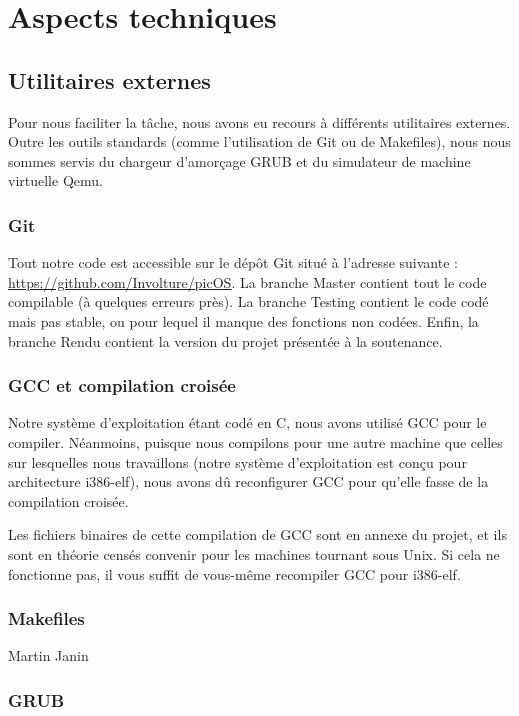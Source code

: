 \documentclass[a4paper,11pt]{article}
\begin{document}
\section{Aspects techniques}

\subsection{Utilitaires externes}

Pour nous faciliter la tâche, nous avons eu recours à différents utilitaires
externes. Outre les outils standards (comme l'utilisation de Git ou de
Makefiles), nous nous sommes servis du chargeur d'amorçage GRUB et du simulateur
de machine virtuelle Qemu.

\subsubsection{Git}

Tout notre code est accessible sur le dépôt Git situé à l'adresse suivante :
\url{https://github.com/Involture/picOS}. La branche Master contient tout le
code compilable (à quelques erreurs près). La branche Testing contient le code
codé mais pas stable, ou pour lequel il manque des fonctions non codées. Enfin,
la branche Rendu contient la version du projet présentée à la soutenance.

\subsubsection{GCC et compilation croisée}

Notre système d'exploitation étant codé en C, nous avons utilisé GCC pour le
compiler. Néanmoins, puisque nous compilons pour une autre machine que celles
sur lesquelles nous travaillons (notre système d'exploitation est conçu pour
architecture i386-elf), nous avons dû reconfigurer GCC pour qu'elle fasse de la
compilation croisée.

Les fichiers binaires de cette compilation de GCC sont en annexe du projet, et
ils sont en théorie censés convenir pour les machines tournant sous Unix. Si
cela ne fonctionne pas, il vous suffit de vous-même recompiler GCC pour
i386-elf.

\subsubsection{Makefiles}

Martin Janin

\subsubsection{GRUB}
\end{document}
